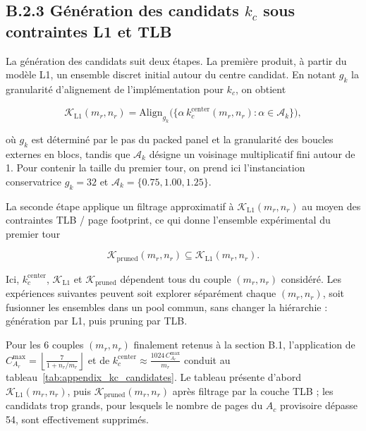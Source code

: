 \documentclass[a4paper,11pt,oneside]{article}
\begin{document}
\subsection*{B.2.3 Génération des candidats $k_c$ sous contraintes L1 et TLB}

La génération des candidats suit deux étapes. La première produit, à partir du modèle L1, un ensemble discret initial autour du centre candidat. En notant $g_k$ la granularité d'alignement de l'implémentation pour $k_c$, on obtient

$$
\mathcal{K}_{\mathrm{L1}}(m_r,n_r) = \mathrm{Align}_{g_k}\bigl(\{ \alpha\, k_c^{\text{center}}(m_r,n_r) : \alpha \in \mathcal{A}_k \}\bigr),
$$

où $g_k$ est déterminé par le pas du packed panel et la granularité des boucles externes en blocs, tandis que $\mathcal{A}_k$ désigne un voisinage multiplicatif fini autour de 1. Pour contenir la taille du premier tour, on prend ici l'instanciation conservatrice $g_k=32$ et $\mathcal{A}_k=\{0.75,1.00,1.25\}$.

La seconde étape applique un filtrage approximatif à $\mathcal{K}_{\mathrm{L1}}(m_r,n_r)$ au moyen des contraintes TLB / page footprint, ce qui donne l'ensemble expérimental du premier tour

$$
\mathcal{K}_{\mathrm{pruned}}(m_r,n_r) \subseteq \mathcal{K}_{\mathrm{L1}}(m_r,n_r).
$$

Ici, $k_c^{\text{center}}$, $\mathcal{K}_{\mathrm{L1}}$ et $\mathcal{K}_{\mathrm{pruned}}$ dépendent tous du couple $(m_r,n_r)$ considéré. Les expériences suivantes peuvent soit explorer séparément chaque $(m_r,n_r)$, soit fusionner les ensembles dans un pool commun, sans changer la hiérarchie : génération par L1, puis pruning par TLB.

Pour les 6 couples $(m_r,n_r)$ finalement retenus à la section B.1, l'application de $C_{A_r}^{\max}=\left\lfloor \frac{7}{1+n_r/m_r} \right\rfloor$ et de $k_c^{\text{center}} \approx \frac{1024\,C_{A_r}^{\max}}{m_r}$ conduit au tableau~\ref{tab:appendix_kc_candidates}. Le tableau présente d'abord $\mathcal{K}_{\mathrm{L1}}(m_r,n_r)$, puis $\mathcal{K}_{\mathrm{pruned}}(m_r,n_r)$ après filtrage par la couche TLB ; les candidats trop grands, pour lesquels le nombre de pages du $A_c$ provisoire dépasse 54, sont effectivement supprimés.
\end{document}
